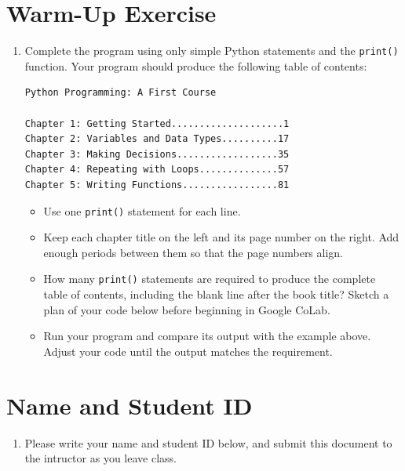 \documentclass{article}
\begin{document}
\section{Warm-Up Exercise}

\begin{enumerate}

\item Complete the program using only simple Python statements and the \texttt{print()} function.  Your program should produce the following table of contents:

\begin{verbatim}
Python Programming: A First Course

Chapter 1: Getting Started....................1
Chapter 2: Variables and Data Types..........17
Chapter 3: Making Decisions..................35
Chapter 4: Repeating with Loops..............57
Chapter 5: Writing Functions.................81
\end{verbatim}

\begin{itemize}

\item Use one \texttt{print()} statement for each line. \\ \vspace{0.25cm}

\item Keep each chapter title on the left and its page number on the right.  Add enough periods between them so that the page numbers align. \\ \vspace{0.25cm}

\item How many \texttt{print()} statements are required to produce the complete table of contents, including the blank line after the book title? Sketch a plan of your code below before beginning in Google CoLab. \\ \vspace{0.5cm}

\item Run your program and compare its output with the example above.  Adjust your code until the output matches the requirement. \\ \vspace{0.5cm}

\end{itemize}
\end{enumerate}

\vspace{4cm}

\section{Name and Student ID}

\begin{enumerate}
\item Please write your name and student ID below, and submit this document to the intructor as you leave class.
\end{enumerate}
\end{document}
